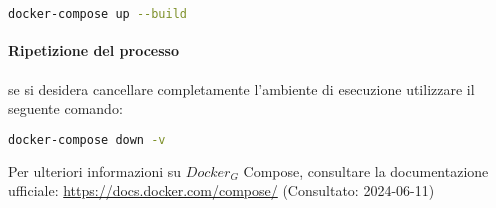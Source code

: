 \begin{lstlisting}[language=bash, caption=Riconstruire e inizializzare i container]
docker-compose up --build
\end{lstlisting}

\paragraph{Ripetizione del processo} se si desidera cancellare completamente l'ambiente di esecuzione utilizzare il seguente comando:

\begin{lstlisting}[language=bash, caption=Rimozione dei container e dei volumi]
docker-compose down -v 
\end{lstlisting}
Per ulteriori informazioni su $\textit{Docker}_G$ Compose, consultare la documentazione ufficiale: \url{https://docs.docker.com/compose/} (Consultato: 2024-06-11)